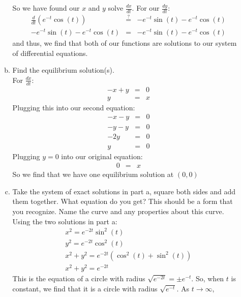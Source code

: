 \documentclass[12pt,letterpaper]{article}
\begin{document}
\begin{enumerate}
\begin{enumerate}[a)]
So we have found our $x$ and $y$ solve $\frac{dx}{dt}$. For our $\frac{dy}{dt}$: 
\begin{eqnarray}
  \frac{d}{dt}(e^{-t}\cos(t)) &\stackrel{?}{=}& -e^{-t}\sin(t) - e^{-t}\cos(t)\\
  -e^{-t}\sin(t) - e^{-t}\cos(t) &\stackrel{}{=}& -e^{-t}\sin(t) - e^{-t}\cos(t)
\end{eqnarray}
and thus, we find that both of our functions are solutions to our system of 
differential equations.

\item  Find the equilibrium solution(s).\\
For $\frac{dx}{dt}$: 
\begin{eqnarray*}
  -x+y &=& 0\\
  y &=& x
\end{eqnarray*}
Plugging this into our second equation: 
\begin{eqnarray*}
  -x - y &=& 0\\ 
  -y - y &=& 0\\
  -2y &=& 0\\
  y &=& 0
\end{eqnarray*}
Plugging $y=0$ into our original equation: 
\begin{eqnarray*}
  0 &=& x
\end{eqnarray*}
So we find that we have one equilibrium solution at $(0, 0)$


\item  Take the system of  exact solutions in part a, square both sides and add them together. What equation do you get? This should be a form that you recognize. Name the curve and any properties about this curve.
\\
Using the two solutions in part a: 
\begin{eqnarray*}
  x^2 = e^{-2t}\sin^{2}(t)\\
  y^2 = e^{-2t}\cos^{2}(t)\\
  x^2 + y^2 = e^{-2t}(\cos^2(t) + \sin^2(t))\\
  x^2 + y^2 = e^{-2t}
\end{eqnarray*}
This is the equation of a circle with radius $\sqrt{e^{-2t}} = \pm e^{-t}$. So, when 
$t$ is constant, we find that it is a circle with radius $\sqrt{e^{-t}}$. As $t \rightarrow \infty$, 



\end{enumerate}
\end{enumerate}
\end{document}
